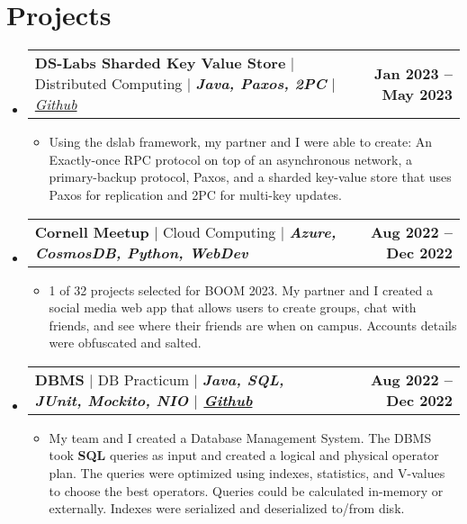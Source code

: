 \documentclass[letterpaper,11pt]{article}
\makeatletter
\newcommand{\resumeItem}[1]{
  \item\small{
    {#1 \vspace{-2pt}}
  }
}
\newcommand{\resumeProjectHeading}[2]{
    \item
    \begin{tabular*}{1.001\textwidth}{l@{\extracolsep{\fill}}r}
      \small#1 & \textbf{\small #2}\\
    \end{tabular*}\vspace{-7pt}
}
\newcommand{\resumeSubHeadingListStart}{\begin{itemize}[leftmargin=0.0in, label={}]}
\newcommand{\resumeSubHeadingListEnd}{\end{itemize}}
\newcommand{\resumeItemListStart}{\begin{itemize}}
\newcommand{\resumeItemListEnd}{\end{itemize}\vspace{-5pt}}
\makeatother
\begin{document}
\section{Projects}
    \vspace{-6pt}
    \resumeSubHeadingListStart
    \resumeProjectHeading
          {\textbf{DS-Labs Sharded Key Value Store} $|$ Distributed Computing $|$ \textbf{\emph{Java, Paxos, 2PC}}\emph{ $|$
          \href{https://github.com/emichael/dslabs}{Github}}}{Jan 2023 -- May 2023}
          \resumeItemListStart
            \resumeItem{ Using the dslab framework, my partner and I were able to create:
            An Exactly-once RPC protocol on top of an asynchronous network, a primary-backup protocol, 
            Paxos, and a sharded key-value store that uses Paxos for replication and 2PC for multi-key updates.}
          \resumeItemListEnd
          \vspace{-14pt}
    \resumeProjectHeading
          {\textbf{Cornell Meetup} $|$ Cloud Computing $|$ \textbf{\emph{Azure, CosmosDB, Python, WebDev}}\emph{ $|$
          \href{https://github.com/MitchellGray100/CornellMeetUp}{Github}
          $|$ \href{https://cis.cornell.edu/about/outreach-events/boom-bits-our-minds/projects/boom-2023-projects}}
          {BOOM}}{Aug 2022 -- Dec 2022}
          \resumeItemListStart
            \resumeItem{ 1 of 32 projects selected for BOOM 2023. My partner and I created a 
            social media web app that allows users to create groups, chat with friends,
            and see where their friends are when on campus. Accounts details were obfuscated and salted.}
          \resumeItemListEnd
          \vspace{-14pt}
    \resumeProjectHeading
          {\textbf{DBMS} $|$ DB Practicum $|$ \textbf{\emph{Java, SQL, JUnit, Mockito, NIO}\emph{ $|$
          \href{https://github.com/MitchellGray100/DBMS}{Github}}}}{Aug 2022 -- Dec 2022}
          \resumeItemListStart
            \resumeItem{ My team and I created a Database Management System. The DBMS   
            took \textbf{SQL} queries as input and created a logical and physical operator plan. The queries were   
            optimized using indexes, statistics, and V-values to choose the best operators. 
            Queries could be calculated in-memory or externally. Indexes were 
            serialized and deserialized to/from disk.
            }
          \resumeItemListEnd
          \vspace{-14pt}
    \resumeSubHeadingListEnd
\vspace{-3pt}
\end{document}
